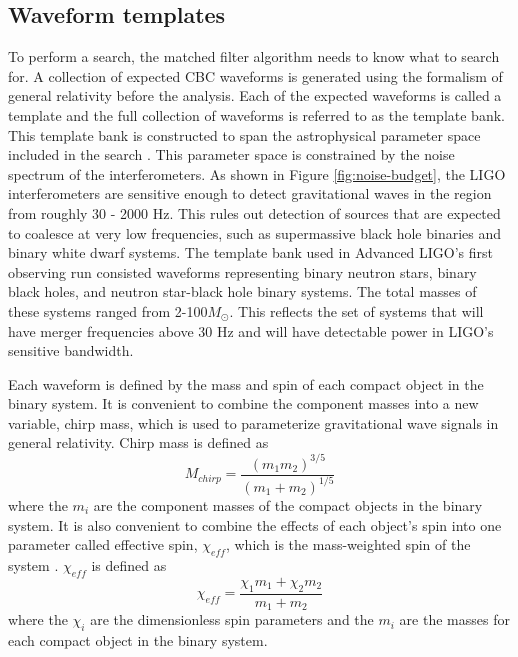 \subsection{Waveform templates}

To perform a search, the matched filter algorithm needs to know what to search for.
A collection of expected CBC waveforms is generated using
the formalism of general relativity before the analysis.
Each of the expected waveforms is called a template and
the full collection of waveforms is referred to as the template bank. This template bank
is constructed to span the astrophysical parameter space included in the search
\cite{GW150914-CBC}. This parameter space is constrained by the noise spectrum of 
the interferometers. As shown in Figure \ref{fig:noise-budget}, the LIGO 
interferometers are sensitive enough to detect gravitational waves in the 
region from roughly 30 - 2000 Hz. This rules out detection of sources that are expected to 
coalesce at very low frequencies, such as supermassive black hole binaries and 
binary white dwarf systems. The template bank used in Advanced LIGO's first observing 
run consisted waveforms representing binary neutron stars, binary black holes, and neutron star-black hole binary systems. The total masses of these systems ranged from 
2-100$M_{\odot}$. This reflects the set of systems that will have merger frequencies 
above 30 Hz and will have detectable power in LIGO's sensitive bandwidth.

Each waveform is defined by the mass and spin of each compact
object in the binary system. 
It is convenient to combine
the component masses into a new variable, chirp mass, which is used to
parameterize gravitational wave signals in general relativity. Chirp mass is defined
as
\begin{equation}
M_{chirp} = \frac{(m_1m_2)^{3/5}}{(m_1 + m_2)^{1/5}}
\end{equation}
where the $m_{i}$ are the component masses of the compact objects in the
binary system. 
It is also convenient to combine the effects of each
object's spin into one parameter called effective spin, $\chi_{eff}$,
which is the
mass-weighted spin of the system \cite{Privitera:2013xza}. $\chi_{eff}$ is defined as
\begin{equation}
\chi_{eff} = \frac{\chi_{1}m_{1} + \chi_{2}m_{2}}{m_{1} + m_{2}}
\end{equation}
where the $\chi_{i}$ are the dimensionless spin parameters \cite{Kidder:1995zr}
and the $m_{i}$ are the masses for each compact object in the binary system. 

